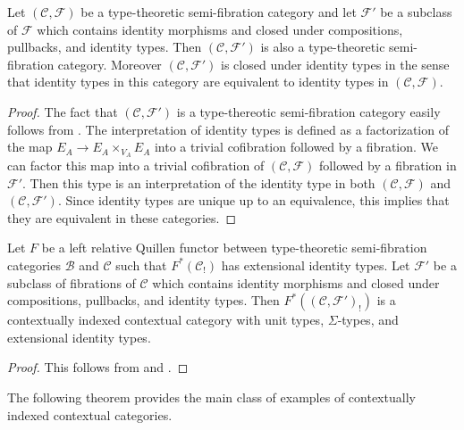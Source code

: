 \documentclass[reqno]{amsart}
\theoremstyle{definition}
\theoremstyle{remark}
\newcommand{\scat}[1]{\mathcal{#1}}
\newcommand{\Fib}{\mathcal{F}}
\numberwithin{figure}{section}
\begin{document}
\begin{prop}
Let $(\scat{C},\Fib)$ be a type-theoretic semi-fibration category and let $\Fib'$ be a subclass of $\Fib$ which contains identity morphisms and closed under compositions, pullbacks, and identity types.
Then $(\scat{C},\Fib')$ is also a type-theoretic semi-fibration category.
Moreover $(\scat{C},\Fib')$ is closed under identity types in the sense that identity types in this category are equivalent to identity types in $(\scat{C},\Fib)$.
\end{prop}
\begin{proof}
The fact that $(\scat{C},\Fib')$ is a type-thereotic semi-fibration category easily follows from .
The interpretation of identity types is defined as a factorization of the map $E_A \to E_A \times_{V_A} E_A$ into a trivial cofibration followed by a fibration.
We can factor this map into a trivial cofibration of $(\scat{C},\Fib)$ followed by a fibration in $\Fib'$.
Then this type is an interpretation of the identity type in both $(\scat{C},\Fib)$ and $(\scat{C},\Fib')$.
Since identity types are unique up to an equivalence, this implies that they are equivalent in these categories.
\end{proof}

\begin{cor}
Let $F$ be a left relative Quillen functor between type-theoretic semi-fibration categories $\scat{B}$ and $\scat{C}$ such that $F^*(\scat{C}_!)$ has extensional identity types.
Let $\Fib'$ be a subclass of fibrations of $\scat{C}$ which contains identity morphisms and closed under compositions, pullbacks, and identity types.
Then $F^*((\scat{C},\Fib')_!)$ is a contextually indexed contextual category with unit types, $\Sigma$-types, and extensional identity types.
\end{cor}
\begin{proof}
This follows from  and .
\end{proof}

The following theorem provides the main class of examples of contextually indexed contextual categories.
\end{document}
